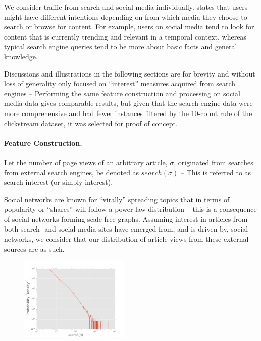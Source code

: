 We consider traffic from search and social media individually. \cite{teevan2011twittersearch} states that users might have different intentions depending on from which media they choose to search or browse for content. For example,  users on social media tend to look for content that is currently trending and relevant in a temporal context, whereas typical search engine queries tend to be more about basic facts and general knowledge.

Discussions and illustrations in the following sections are for brevity and without loss of generality only focused on ``interest'' measures acquired from search engines -- Performing the same feature construction and processing on social media data gives comparable results, but given that the search engine data were more comprehensive and had fewer instances filtered by the 10-count rule of the clickstream dataset, it was selected for proof of concept.
%
%
%
%
%
\paragraph{Feature Construction.}
Let the number of page views of an arbitrary article, $\sigma$, originated from searches from external search engines, be denoted as $search(\sigma)$ -- This is referred to as search interest (or simply interest).

Social networks are known for ``virally'' spreading topics that in terms of popularity or ``shares'' will follow a power law distribution \cite{jain2014scalable} -- this is a consequence of social networks forming scale-free graphs. Assuming interest in articles from both search- and social media sites have emerged from, and is driven by, social networks, we consider that our distribution of article views from these external sources are as such.

\begin{figure}[H]
\centering
    \includegraphics[width=0.47\textwidth]{images/loglog}
 \label{fig:loglog}
\end{figure}


